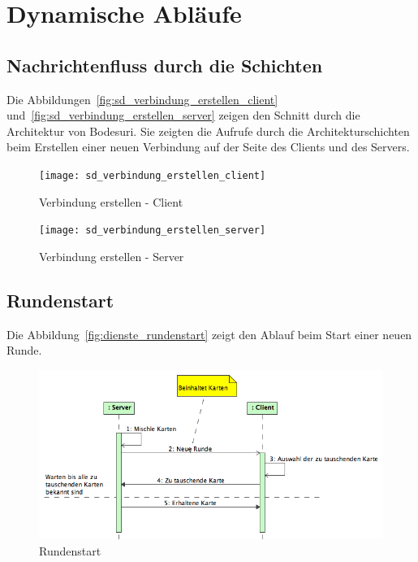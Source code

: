\documentclass[12pt,halfparskip]{scrartcl}
\begin{document}
\clearpage
\section{Dynamische Abläufe} %
\label{dynamische_ablauefe}
\subsection{Nachrichtenfluss durch die Schichten} %
\label{sub:nachrichtenfluss_durch_die_schichten}
Die Abbildungen~\vref{fig:sd_verbindung_erstellen_client} und~\vref{fig:sd_verbindung_erstellen_server} zeigen den Schnitt durch die Architektur von Bodesuri. Sie zeigten die Aufrufe durch die Architekturschichten beim Erstellen einer neuen Verbindung auf der Seite des Clients und des Servers.
\begin{figure}[h]
	\centering
	\texttt{[image: sd\_verbindung\_erstellen\_client]}
	\caption{Verbindung erstellen - Client}
	\label{fig:sd_verbindung_erstellen_client}
\end{figure}
\begin{figure}[h]
	\centering
	\texttt{[image: sd\_verbindung\_erstellen\_server]}
	\caption{Verbindung erstellen - Server}
	\label{fig:sd_verbindung_erstellen_server}
\end{figure}

\subsection{Rundenstart} %
\label{sub:rundenstart}
Die Abbildung~\vref{fig:dienste_rundenstart} zeigt den Ablauf beim Start einer neuen Runde.
\begin{figure}[h]
	\centering
	\includegraphics[width=\textwidth]{dienste_rundenstart}
	\caption{Rundenstart}
	\label{fig:dienste_rundenstart}
\end{figure}
\end{document}
